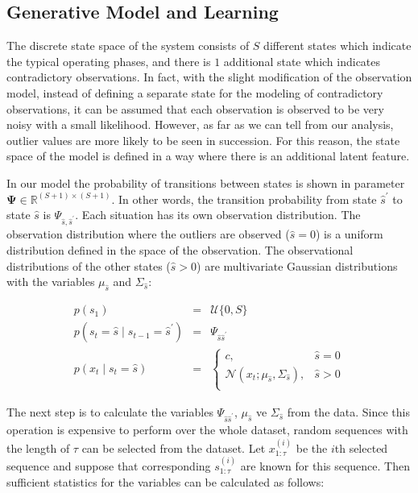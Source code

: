 \subsection{Generative Model and Learning}

The discrete state space of the system consists of $S$ different states which indicate the typical operating phases, and there is $1$ additional state which indicates contradictory observations. In fact, with the slight modification of the observation model, instead of defining a separate state for the modeling of contradictory observations, it can be assumed that each observation is observed to be very noisy with a small likelihood. However, as far as we can tell from our analysis, outlier values are more likely to be seen in succession. For this reason, the state space of the model is defined in a way where there is an additional latent feature.

In our model the probability of transitions between states is shown in parameter $\boldsymbol{\Psi} \in \mathbb{R}^{(S+1) \times (S+1)}$. In other words, the transition probability from state $\hat{s}^{\prime}$ to state $\hat{s}$ is $\Psi_{\hat{s}, \hat{s}^{\prime}}$. Each situation has its own observation distribution. The observation distribution where the outliers are observed ($\hat{s}=0$) is a uniform distribution defined in the space of the observation. The observational distributions of the other states ($\hat{s}>0$) are multivariate Gaussian distributions with the variables $\mu_{\hat{s}}$ and $\Sigma_{\hat{s}}$:

\begin{eqnarray}
p(s_1) & = & \mathcal{U}\{0,S\} \\
p(s_{t} =\hat{s} \mid s_{t-1}=\hat{s}^{\prime}) & = & \Psi_{\hat{s} \hat{s}^{\prime}} \\
p(x_{t} \mid s_t = \hat{s}) & = &
\begin{cases}
c,& \hat{s} = 0 \\
\mathcal{N}(x_t;\mu_{\hat{s}},\Sigma_{\hat{s}}),& \hat{s} > 0 \\
\end{cases}
\end{eqnarray}

The next step is to calculate the variables $\Psi_{\hat{s} \hat{s}^{\prime}}$, $\mu_{\hat{s}}$ ve $\Sigma_{\hat{s}}$ from the data. Since this operation is expensive to perform over the whole dataset, random sequences with the length of $ \tau $ can be selected from the dataset. Let $x^{(i)}_{1:\tau}$ be the $i$th selected sequence and suppose that corresponding $s^{(i)}_{1:\tau}$ are known for this sequence. Then sufficient statistics for the variables can be calculated as follows:

